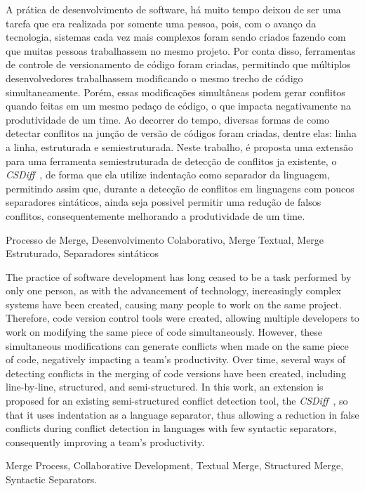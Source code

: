 \resumo
A prática de desenvolvimento de software, há muito tempo deixou de ser uma tarefa
que era realizada por somente uma pessoa, pois, com o avanço da tecnologia, sistemas
cada vez mais complexos foram sendo criados fazendo com que muitas pessoas trabalhassem no
mesmo projeto. Por conta disso, ferramentas de controle de versionamento de
código foram criadas, permitindo que múltiplos desenvolvedores trabalhassem modificando
o mesmo trecho de código simultaneamente. Porém, essas modificações simultâneas
podem gerar conflitos quando feitas em um mesmo pedaço de código, o que impacta
negativamente na produtividade de um time. Ao decorrer do tempo, diversas formas
de como detectar conflitos na junção de versão de códigos foram criadas, dentre
elas: linha a linha, estruturada e semiestruturada. Neste trabalho,
é proposta uma extensão para uma ferramenta semiestruturada de detecção de conflitos
ja existente, o \emph{CSDiff}~\cite{clem21}, de forma que ela
utilize indentação como separador da linguagem, permitindo assim que, durante a
detecção de conflitos em linguagens com poucos separadores sintáticos, ainda seja
possivel permitir uma redução de falsos conflitos, consequentemente melhorando a
produtividade de um time.
\begin{keywords}
	Processo de Merge, Desenvolvimento Colaborativo, Merge Textual, Merge
	Estruturado, Separadores sintáticos
\end{keywords}

\abstract
The practice of software development has long ceased to be a task performed by
only one person, as with the advancement of technology, increasingly complex
systems have been created, causing many people to work on the same project.
Therefore, code version control tools were created, allowing multiple developers
to work on modifying the same piece of code simultaneously. However, these simultaneous
modifications can generate conflicts when made on the same piece of code, negatively
impacting a team's productivity. Over time, several ways of detecting conflicts
in the merging of code versions have been created, including line-by-line, structured,
and semi-structured. In this work, an extension is proposed for an existing
semi-structured conflict detection tool, the \emph{CSDiff}~\cite{clem21},
so that it uses indentation as a language separator, thus allowing a reduction in
false conflicts during conflict detection in languages with few syntactic separators,
consequently improving a team's productivity.
\begin{keywords}
	Merge Process, Collaborative Development, Textual Merge, Structured Merge, Syntactic Separators.
\end{keywords}

